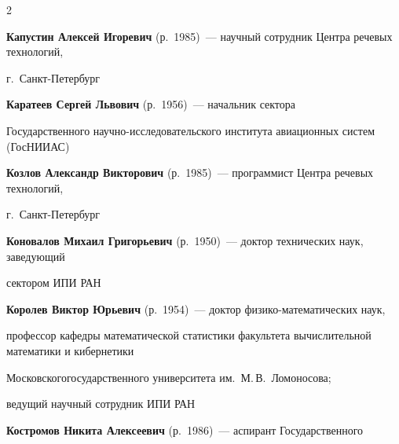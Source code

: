 \begin{multicols}{2}
\noindent

\textbf{Капустин Алексей Игоревич} (р.\ 1985)~--- научный сотрудник Центра речевых технологий, 

г.~Санкт-Пе\-тер\-бург



\vspace*{6pt}



\noindent

\textbf{Каратеев Сергей Львович} (р.\ 1956)~--- начальник сектора 

Государственного научно-исследовательского института авиационных систем (ГосНИИАС)



\vspace*{6pt}



\noindent

\textbf{Козлов Александр Викторович} (р.\ 1985)~--- программист Центра речевых технологий, 

г.~Санкт-Пе\-тер\-бург

\columnbreak






\noindent

\textbf{Коновалов Михаил Григорьевич} (р.\ 1950)~--- доктор технических наук, заведующий

сектором ИПИ РАН



\vspace*{4pt}



\noindent

\textbf{Королев Виктор Юрьевич} (р.\ 1954)~--- доктор фи\-зи\-ко-ма\-те\-ма\-ти\-че\-ских наук, 

профессор кафедры математической статистики факультета вычислительной математики и кибернетики 

Московского\linebreak государственного университета им.~М.\,В.~Ломоносова;

ведущий научный сотрудник ИПИ РАН



\vspace*{4pt}



\noindent

\textbf{Костромов Никита Алексеевич} (р.\ 1986)~--- аспирант Государственного 


\end{multicols}

